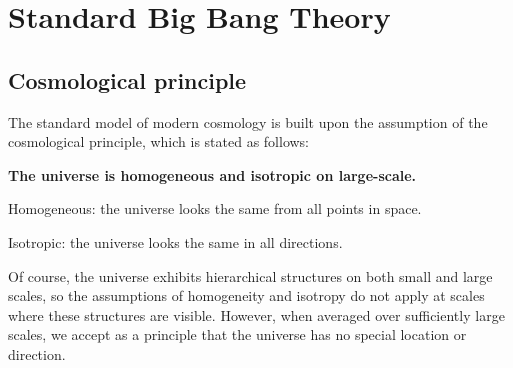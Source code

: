 \documentclass[12pt]{article}
\newcommand{\tcb}[2]{\begin{tcolorbox}[title={\textcolor{white}{#1}}, opacitybacktitle = 0, colframe=white!40!black]#2
\end{tcolorbox}}
\numberwithin{equation}{section}
\begin{document}
\section{Standard Big Bang Theory}
\subsection{Cosmological principle}
The standard model of modern cosmology is built upon the assumption of the cosmological principle, which is stated as follows:
\tcb{Cosmological principle}{\textbf{The universe is homogeneous and isotropic on large-scale.}\par
Homogeneous: the universe looks the same from all points in space.\par
Isotropic: the universe looks the same in all directions.}
\noindent Of course, the universe exhibits hierarchical structures on both small and large scales, so the assumptions of homogeneity and isotropy do not apply at scales where these structures are visible. However, when averaged over sufficiently large scales, we accept as a principle that the universe has no special location or direction.
\end{document}
